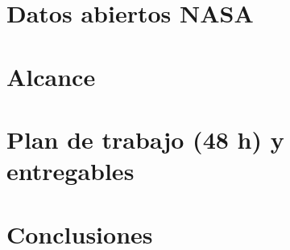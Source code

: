 \documentclass[conference]{IEEEtran}
\begin{document}
\section{Datos abiertos NASA}

\section{Alcance}

\section{Plan de trabajo (48 h) y entregables}

\section{Conclusiones}
\end{document}
